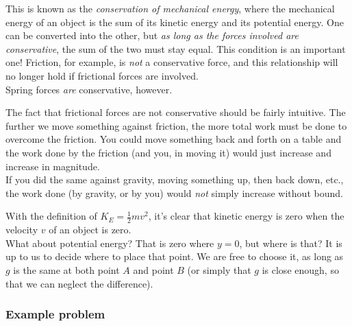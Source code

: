 This is known as the \emph{conservation of mechanical energy}, where the mechanical energy of an object is the sum of its kinetic energy and its potential energy. One can be converted into the other, but \emph{as long as the forces involved are conservative}, the sum of the two must stay equal. This condition is an important one! Friction, for example, is \emph{not} a conservative force, and this relationship will no longer hold if frictional forces are involved.\\
Spring forces \emph{are} conservative, however.

The fact that frictional forces are not conservative should be fairly intuitive. The further we move something against friction, the more total work must be done to overcome the friction. You could move something back and forth on a table and the work done by the friction (and you, in moving it) would just increase and increase in magnitude.\\
If you did the same against gravity, moving something up, then back down, etc., the work done (by gravity, or by you) would \emph{not} simply increase without bound.

With the definition of $K_E = \frac{1}{2} m v^2$, it's clear that kinetic energy is zero when the velocity $v$ of an object is zero.\\
What about potential energy? That is zero where $y = 0$, but where is that? It is up to us to decide where to place that point. We are free to choose it, as long as $g$ is the same at both point $A$ and point $B$ (or simply that $g$ is close enough, so that we can neglect the difference).

\subsubsection{Example problem}

